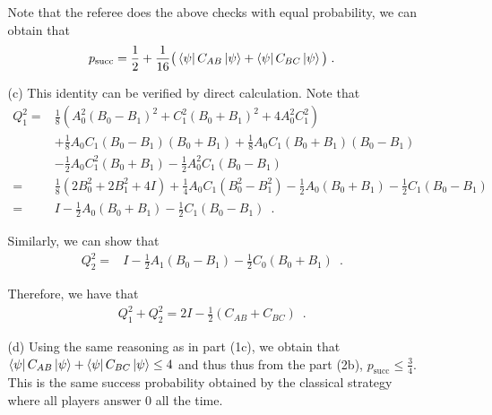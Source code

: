 \documentclass[12pt]{article}
\begin{document}
\begin{enumerate}
\begin{enumerate}
Note that the referee does the above checks with equal probability, we can obtain that
\[p_{\text{succ}} = \frac{1}{2} + \frac{1}{16}\big( \bra{\psi} C_{AB}\ket{\psi} + \bra{\psi} C_{BC}\ket{\psi}\big)\;.\]
\item[(c)] This identity can be verified by direct calculation. Note that 
\begin{align*}
Q_1^2 =& \frac{1}{8}\left(A_0^2(B_0 - B_1)^2 + C_1^2(B_0 + B_1)^2 + 4A_0^2C_1^2\right)\\
 &+ \frac{1}{8} A_0C_1 (B_0 - B_1) (B_0 + B_1) + \frac{1}{8} A_0C_1 (B_0 + B_1) (B_0 - B_1)\\
 &- \frac{1}{2}A_0 C_1^2(B_0 + B_1) - \frac{1}{2}A_0^2C_1(B_0 - B_1)\\
 =& \frac{1}{8}\left(2B_0^2 + 2B_1^2 + 4I\right) + \frac{1}{4} A_0C_1 (B_0^2 - B_1^2) - \frac{1}{2}A_0(B_0 + B_1) - \frac{1}{2}C_1(B_0 - B_1)\\
  =& I - \frac{1}{2}A_0(B_0 + B_1) - \frac{1}{2}C_1(B_0 - B_1)\enspace.
\end{align*}

Similarly, we can show that
\begin{align*}
Q_2^2
  =& I - \frac{1}{2}A_1(B_0 - B_1) - \frac{1}{2}C_0(B_0 + B_1)\enspace.
\end{align*}

Therefore, we have that
\begin{align*}
Q_1^2 + Q_2^2 = 2I - \frac{1}{2}(C_{AB} + C_{BC})\enspace.
\end{align*}


\item[(d)] Using the same reasoning as in part (1c), we obtain that $\bra{\psi}C_{AB}\ket{\psi} + \bra{\psi}C_{BC}\ket{\psi} \le 4$ and thus thus from the part (2b), $p_{\text{succ}}\leq \frac{3}{4}$. This is the same success probability obtained by the  classical strategy where all players answer $0$ all the time. 
\end{enumerate}
\end{enumerate}
\end{document}
